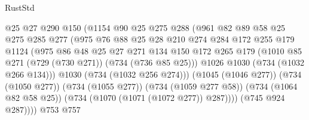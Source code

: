 \begin{lexlean}{RustStd}
\begin{coremodule}
                                  @25
                                  @27
                                  @290
                                  @150
                                  (@1154
                                    @90
                                    @25
                                    @275
                                    @288
                                    (@961
                                      @82
                                      @89
                                      @58
                                      @25
                                      @275
                                      @285
                                      @277
                                      (@975
                                        @76
                                        @88
                                        @25
                                        @28
                                        @210
                                        @274
                                        @284
                                        @172
                                        @255
                                        @179
                                        @1124
                                        (@975
                                          @86
                                          @48
                                          @25
                                          @27
                                          @271
                                          @134
                                          @150
                                          @172
                                          @265
                                          @179
                                          (@1010 @85 @271 (@729 (@730 @271)) (@734 (@736 @85 @25)))
                                          @1026
                                          @1030
                                          (@734 (@1032 @266 @134)))
                                        @1030
                                        (@734 (@1032 @256 @274)))
                                      (@1045 (@1046 @277))
                                      (@734 (@1050 @277))
                                      (@734 (@1055 @277))
                                      (@734 (@1059 @277 @58))
                                      (@734 (@1064 @82 @58 @25))
                                      (@734 (@1070 (@1071 (@1072 @277)) @287))))
                                  (@745 @924 @287))))
                            @753
                            @757

\end{coremodule}
\end{lexlean}
